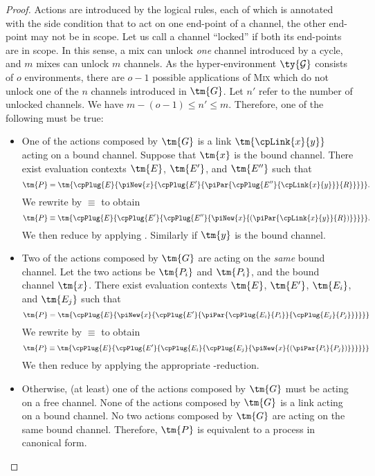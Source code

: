 \begin{proof}
  Actions are introduced by the logical rules, each of which is annotated with
  the side condition that to act on one end-point of a channel, the other
  end-point may not be in scope.
  Let us call a channel ``locked'' if both its end-points are in scope.
  In this sense, a mix can unlock \emph{one} channel introduced by a cycle,
  and $m$ mixes can unlock $m$ channels.
  As the hyper-environment $\ty{\mathcal{G}}$ consists of $o$ environments,
  there are $o - 1$ possible applications of \textsc{Mix} which do not unlock
  one of the $n$ channels introduced in $\tm{G}$.
  Let $n'$ refer to the number of unlocked channels.
  We have $m - (o - 1) \le n' \le m$.
  Therefore, one of the following must be true:
  \begin{itemize}
  \item
    One of the actions composed by $\tm{G}$ is a link $\tm{\cpLink{x}{y}}$
    acting on a bound channel.
    Suppose that $\tm{x}$ is the bound channel.
    There exist evaluation contexts $\tm{E}$, $\tm{E'}$, and $\tm{E''}$ such that
    \[
      \tm{P} =
      \tm{\cpPlug{E}{\piNew{x}{\cpPlug{E'}{\piPar{\cpPlug{E''}{\cpLink{x}{y}}}{R}}}}}.
    \]
    We rewrite by $\equiv$ to obtain
    \[
      \tm{P} \equiv
      \tm{\cpPlug{E}{\cpPlug{E'}{\cpPlug{E''}{\piNew{x}{( \piPar{\cpLink{x}{y}}{R} )}}}}}.
    \]
    We then reduce by applying .
    Similarly if $\tm{y}$ is the bound channel.
  \item
    Two of the actions composed by $\tm{G}$ are acting on the \emph{same}
    bound channel.
    Let the two actions be $\tm{P_i}$ and $\tm{P_i}$, and the bound channel
    $\tm{x}$.
    There exist evaluation contexts $\tm{E}$, $\tm{E'}$, $\tm{E_i}$, and
    $\tm{E_j}$ such that
    \[
      \tm{P} =
      \tm{\cpPlug{E}{
          \piNew{x}{\cpPlug{E'}{
              \piPar{
                \cpPlug{E_i}{P_i}
              }{
                \cpPlug{E_j}{P_j}
              }}}}}
    \]
    We rewrite by $\equiv$ to obtain
    \[
      \tm{P} \equiv
      \tm{\cpPlug{E}{
          \cpPlug{E'}{
            \cpPlug{E_i}{
              \cpPlug{E_j}{
                \piNew{x}{(\piPar{P_i}{P_j})}
              }}}}}
    \]
    We then reduce by applying the appropriate \textbeta-reduction.
  \item
    Otherwise, (at least) one of the actions composed by $\tm{G}$ must be acting
    on a free channel.
    None of the actions composed by $\tm{G}$ is a link acting on a bound channel.
    No two actions composed by $\tm{G}$ are acting on the same bound channel.
    Therefore, $\tm{P}$ is equivalent to a process in canonical form.
  \end{itemize}
\end{proof}
